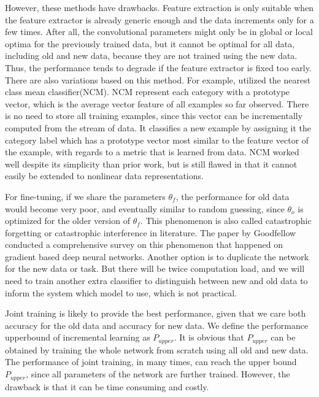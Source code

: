 However, these methods have drawbacks. Feature extraction is only suitable when the feature extractor is already generic enough and the data increments only for a few times. After all, the convolutional parameters might only be in global or local optima for the previously trained data, but it cannot be optimal for all data, including old and new data, because they are not trained using the new data. Thus, the performance tends to degrade if the feature extractor is fixed too early. There are also variations based on this method. For example, \cite{mensink2012metric} utilized the nearest class mean classifier(NCM). NCM represent each category with a prototype vector, which is the average vector feature of all examples so far observed. There is no need to store all training examples, since this vector can be incrementally computed from the stream of data. It classifies a new example by assigning it the category label which has a prototype vector most similar to the feature vector of the example, with regards to a metric that is learned from data. NCM worked well despite its simplicity than prior work, but is still flawed in that it cannot easily be extended to nonlinear data representations.

For fine-tuning, if we share the parameters $\theta_f$, the performance for old data would become very poor, and eventually similar to random guessing, since $\theta_o$ is optimized for the older version of $\theta_f$. This phenomenon is also called catastrophic forgetting or catastrophic interference in literature\cite{goodfellow2013empirical}. The paper by Goodfellow \cite{goodfellow2013empirical} conducted a comprehensive survey on this phenomenon that happened on gradient based deep neural networks. Another option is to duplicate the network for the new data or task. But there will be twice computation load, and we will need to train another extra classifier to distinguish between new and old data to inform the system which model to use, which is not practical. 

Joint training is likely to provide the best performance, given that we care both accuracy for the old data and accuracy for new data. We define the performance upperbound of incremental learning as $P_{upper}$. It is obvious that $P_{upper}$ can be obtained by training the whole network from scratch using all old and new data. The performance of joint training, in many times, can reach the upper bound $P_{upper}$, since all parameters of the network are further trained. However, the drawback is that it can be time consuming and costly.

